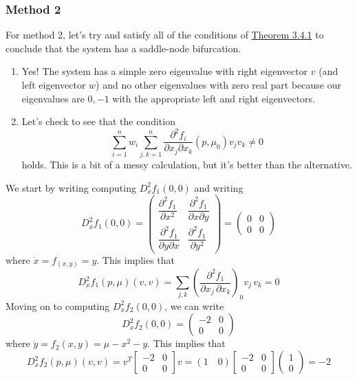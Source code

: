 \documentclass{article}
\begin{document}
\subsubsection{Method 2}

For method 2, let's try and satisfy all of the conditions of \underline{Theorem 3.4.1} to conclude that the system has a saddle-node bifurcation.

\begin{enumerate}
    \item Yes! The system has a simple zero eigenvalue with right eigenvector $v$ (and left eigenvector $w$) and no other eigenvalues with zero real part because our eigenvalues are $0,-1$ with the appropriate left and right eigenvectors.
    \item Let's check to see that the condition \[\sum^n_{i=1}w_i\sum_{j,k=1}^{n}\frac{\partial^2 f_i}{\partial x_j \partial x_k}(p,\mu_0)v_j v_k\neq 0\] holds. This is a bit of a messy calculation, but it's better than the alternative.
\end{enumerate}
We start by writing computing $D_x^2 f_1(0,0)$ and writing
\[
D_x^2 f_1(0,0) =
\begin{pmatrix}
    \dfrac{\partial^2 f_1}{\partial x^2} & \dfrac{\partial^2 f_1}{\partial x \partial y} \\[10pt]
    \dfrac{\partial^2 f_1}{\partial y \partial x} & \dfrac{\partial^2 f_1}{\partial y^2}
\end{pmatrix}
=
\begin{pmatrix}
    0 & 0 \\
    0 & 0
\end{pmatrix}
\]
where $\dot{x}=f_(x,y)=y$. This implies that 
\[
D_x^2 f_1(p, \mu)(v, v) = \sum_{j,k} \left(\frac{\partial^2 f_1}{\partial x_j \, \partial x_k}\right)_0 v_j \, v_k = 0
\]
Moving on to computing $D_x^2 f_2(0,0)$, we can write
\[
D_x^2 f_2(0,0) =
\begin{pmatrix}
    -2 & 0 \\
    0  & 0
\end{pmatrix}
\]
where $\dot{y} =f_2(x,y)= \mu - x^2 - y$. This implies that 
\[
D_x^2 f_2(p, \mu)(v, v) = v^T
\begin{bmatrix}
-2 & 0 \\
0  & 0
\end{bmatrix}
v
= (1 \quad 0)
\begin{bmatrix}
-2 & 0 \\
0  & 0
\end{bmatrix}
\begin{pmatrix} 1 \\ 0 \end{pmatrix}
= -2
\]
\end{document}
